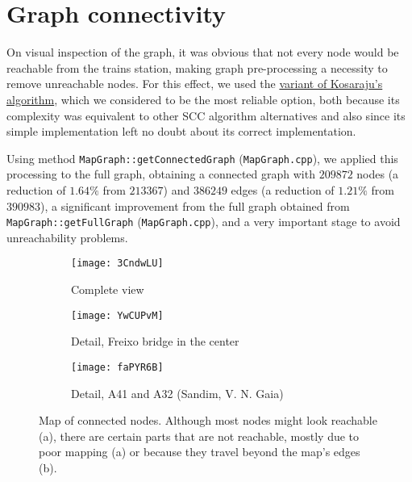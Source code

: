 \chapter{Graph connectivity} \label{connectivity-graphs}
On visual inspection of the graph, it was obvious that not every node would be reachable from the trains station, making graph pre-processing a necessity to remove unreachable nodes.
For this effect, we used the \hyperref[algorithm-scc-kosaraju-v]{variant of Kosaraju's algorithm}, which we considered to be the most reliable option, both because its complexity was equivalent to other \acrshort{SCC} algorithm alternatives and also since its simple implementation left no doubt about its correct implementation.\par
Using method \texttt{MapGraph::getConnectedGraph} (\texttt{MapGraph.cpp}), we applied this processing to the full graph, obtaining a connected graph with $209872$ nodes (a reduction of $1.64\%$ from $213367$) and $386249$ edges (a reduction of $1.21\%$ from $390983$), a significant improvement from the full graph obtained from \texttt{MapGraph::getFullGraph} (\texttt{MapGraph.cpp}), and a very important stage to avoid unreachability problems.
\begin{figure}[h]
    \centering
    \begin{subfigure}{.50\textwidth}
        \centering
        \texttt{[image: 3CndwLU]}
        \caption{Complete view}
    \end{subfigure}
    \begin{subfigure}{.49\textwidth}
        \centering
        \texttt{[image: YwCUPvM]}
        \caption{Detail, Freixo bridge in the center}
        \vspace{0.6em}
        \texttt{[image: faPYR6B]}
        \caption{Detail, A41 and A32 (Sandim, V. N. Gaia)}
    \end{subfigure}
    \caption[Map of connected nodes]{Map of connected nodes. Although most nodes might look reachable (a), there are certain parts that are not reachable, mostly due to poor mapping (a) or because they travel beyond the map's edges (b).}
\end{figure}
